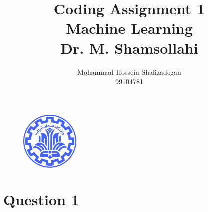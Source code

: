 \documentclass[]{article}
\author{
	Mohammad Hossein Shafizadegan\\
	99104781
}
\title{
	Coding Assignment 1 \\
	Machine Learning  \\
	Dr. M. Shamsollahi
}
\begin{document}
	\begin{figure}
		\includegraphics[width=0.25\textwidth]{Fig/Sharif.png}
		\centering
	\end{figure}
	\maketitle
	\tableofcontents
	\newpage
	\section{Question 1}
\end{document}

